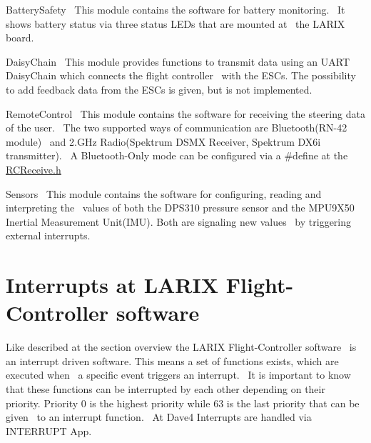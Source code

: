 \begin{DoxyItemize}
\item Battery\+Safety~\newline
 This module contains the software for battery monitoring.~\newline
 It shows battery status via three status L\+ED\textquotesingle{}s that are mounted at~\newline
 the L\+A\+R\+IX board.
\item Daisy\+Chain~\newline
 This module provides functions to transmit data using an U\+A\+RT Daisy\+Chain which connects the flight controller~\newline
 with the E\+SC\textquotesingle{}s. The possibility to add feedback data from the E\+SC\textquotesingle{}s is given, but is not implemented.
\item Remote\+Control~\newline
 This module contains the software for receiving the steering data of the user.~\newline
 The two supported ways of communication are Bluetooth(R\+N-\/42 module)~\newline
 and 2.\+G\+Hz Radio(\+Spektrum D\+S\+M\+X Receiver, Spektrum D\+X6i transmitter).~\newline
 A Bluetooth-\/\+Only mode can be configured via a \#define at the \hyperlink{_r_c_receive_8h}{R\+C\+Receive.\+h}
\item Sensors~\newline
 This module contains the software for configuring, reading and interpreting the~\newline
 values of both the D\+P\+S310 pressure sensor and the M\+P\+U9\+X50 Inertial Measurement Unit(\+I\+M\+U). Both are signaling new values~\newline
 by triggering external interrupts.
\end{DoxyItemize}\hypertarget{index_interrupts}{}\section{Interrupts at L\+A\+R\+I\+X Flight-\/\+Controller software}\label{index_interrupts}
Like described at the section overview the L\+A\+R\+IX Flight-\/\+Controller software~\newline
 is an interrupt driven software. This means a set of functions exists, which are executed when~\newline
 a specific event triggers an interrupt.~\newline
 It is important to know that these functions can be interrupted by each other depending on their~\newline
 priority. Priority 0 is the highest priority while 63 is the last priority that can be given~\newline
 to an interrupt function.~\newline
 At Dave4 Interrupts are handled via I\+N\+T\+E\+R\+R\+U\+PT App.~\newline



